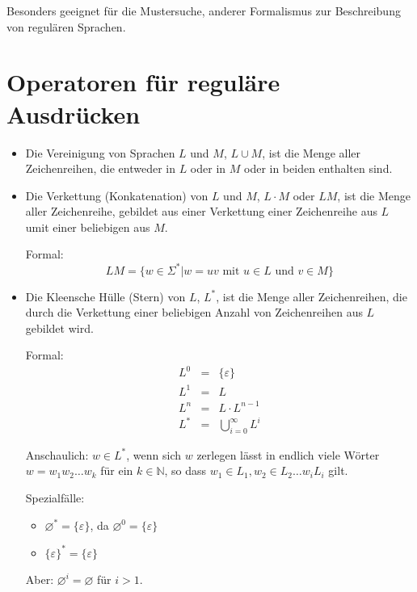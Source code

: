 \documentclass[11pt]{article} %
\theoremstyle{definition}
\begin{document}
Besonders geeignet für die Mustersuche, anderer Formalismus zur Beschreibung von regulären Sprachen.

\section{Operatoren für reguläre Ausdrücken}

\begin{itemize}
\item Die Vereinigung von Sprachen $L$ und $M$, $L \cup M$, ist die Menge aller Zeichenreihen, die entweder in $L$ oder in $M$ oder in beiden enthalten sind.
\item Die Verkettung (Konkatenation) von $L$ und $M$, $L\cdot M$ oder $LM$, ist die Menge aller Zeichenreihe, gebildet aus einer Verkettung einer Zeichenreihe aus $L$ umit einer beliebigen aus $M$.

Formal: \[
LM = \{w \in \Sigma^* | w = uv \textrm{ mit } u \in L \textrm{ und } v \in M \}
\]

\item Die Kleensche Hülle (Stern) von $L$, $L^*$, ist die Menge aller Zeichenreihen, die durch die Verkettung einer beliebigen Anzahl von Zeichenreihen aus $L$ gebildet wird.

Formal:
\begin{eqnarray*}
L^0 &=& \{\varepsilon\} \\
L^1 &=& L \\
L^n &=& L\cdot L^{n-1} \\
L^* &=& \bigcup\limits_{i=0}^\infty L^i
\end{eqnarray*}

Anschaulich: $w \in L^*$, wenn sich $w$ zerlegen lässt in endlich viele Wörter $w = w_1w_2\dots w_k$ für ein $k \in \mathbb{N}$, so dass $w_1\in L_1, w_2 \in L_2 \dots w_i L_i$ gilt.

Spezialfälle:
\begin{itemize}
\item $\varnothing^* = \{\varepsilon\}$, da $\varnothing^0 = \{\varepsilon\}$
\item $\{\varepsilon\}^* = \{\varepsilon\}$
\end{itemize}
Aber: $\varnothing^i = \varnothing$ für $i > 1$.

\end{itemize}
\end{document}
